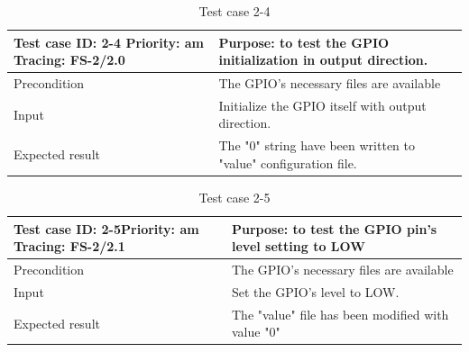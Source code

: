 \begin{table}[H]
	\caption{Test case 2-4}
	\label{table:TCase-FS2-4}
	\begin{center}
		\renewcommand{\arraystretch}{1.8}
		\begin{tabu} 
			to 0.9 \textwidth
			{  X[0.4, c] X[c] }
			\toprule
			Test case ID: 2-4 \newline Priority: am \newline Tracing: FS-2/2.0 & Purpose: to test the GPIO initialization in output direction.   \\ \midrule
			Precondition                                                       & The GPIO's necessary files are available                        \\
			Input                                                              & Initialize the GPIO itself with output direction.               \\
			Expected result                                                    & The "0" string have been written to "value" configuration file. \\ \bottomrule
		\end{tabu}
	\end{center}
\end{table} 

\begin{table}[H]
	\caption{Test case 2-5}
	\label{table:TCase-FS2-5}
	\begin{center}
		\renewcommand{\arraystretch}{1.8}
		\begin{tabu} 
			to 0.9 \textwidth
			{  X[0.4, c] X[c] }
			\toprule
			Test case ID: 2-5\newline Priority: am \newline Tracing: FS-2/2.1 & Purpose: to test the GPIO pin's level setting to LOW \\ \midrule
			Precondition                                                      & The GPIO's necessary files are available             \\
			Input                                                             & Set the GPIO's level to LOW.                         \\
			Expected result                                                   & The "value" file has been modified with value "0"    \\ \bottomrule
		\end{tabu}
	\end{center}
\end{table} 

